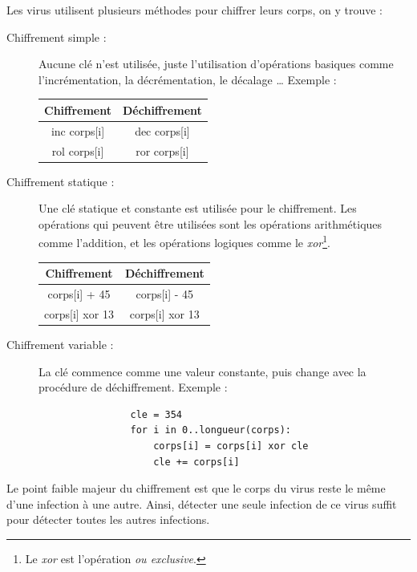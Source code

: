     Les virus utilisent plusieurs méthodes pour chiffrer leurs corps, on y trouve : \cite{virus} %
    \begin{description}
        \item[Chiffrement simple :] Aucune clé n'est utilisée, juste l'utilisation d'opérations basiques comme
            l'incrémentation, la décrémentation, le décalage \ldots{} Exemple :
            \begin{center}
            \begin{tabular}{cc}
                \toprule
                Chiffrement & Déchiffrement \\
                \midrule
                inc corps[i] & dec corps[i] \\
                rol corps[i] & ror corps[i] \\
                \bottomrule
            \end{tabular}
            \end{center}

        \item[Chiffrement statique :] Une clé statique et constante est utilisée pour le chiffrement. Les opérations
            qui peuvent être utilisées sont les opérations arithmétiques comme l'addition, et les opérations logiques
            comme le \emph{xor}\footnote{Le \emph{xor} est l'opération \emph{ou exclusive}.}. %
            \begin{center}
            \begin{tabular}{cc}
                \toprule
                Chiffrement & Déchiffrement \\
                \midrule
                corps[i] + 45 & corps[i] - 45\\
                corps[i] xor 13 & corps[i] xor 13 \\
                \bottomrule
            \end{tabular}
            \end{center}

        \item[Chiffrement variable :] La clé commence comme une valeur constante, puis change avec 
            la procédure de déchiffrement. Exemple : %
            \begin{verbatim}
                cle = 354
                for i in 0..longueur(corps):
                    corps[i] = corps[i] xor cle
                    cle += corps[i]
            \end{verbatim}

    \end{description}
    Le point faible majeur du chiffrement est que le corps du virus reste le même d'une infection à une autre. Ainsi, 
    détecter une seule infection de ce virus suffit pour détecter toutes les autres infections. \cite{virus} %

